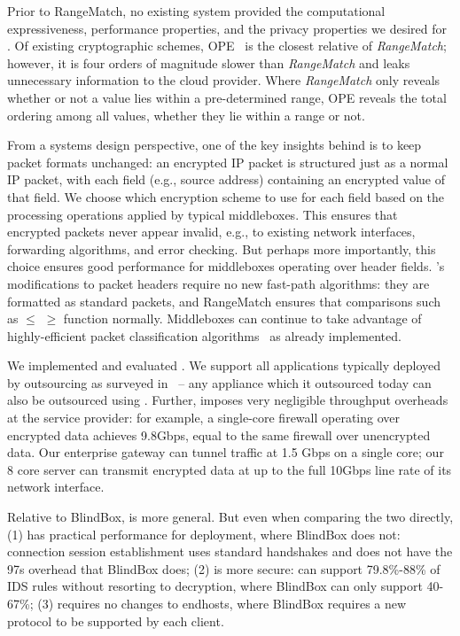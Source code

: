     Prior to RangeMatch, no existing system provided the computational expressiveness, performance properties, and the privacy properties we desired for \sys.
    Of existing cryptographic schemes, OPE~\cite{cryptdb} is the closest relative of {\it RangeMatch}; however, it is four orders of magnitude slower than {\it RangeMatch} and leaks unnecessary information to the cloud provider.
    Where {\em RangeMatch} only reveals whether or not a value lies within a pre-determined range, OPE reveals the total ordering among all values, whether they lie within a range or not.

  From a systems design perspective, one of the key insights behind \sys is to keep packet formats unchanged: an encrypted IP packet is structured just as a normal IP packet, with each field (e.g., source address) containing an encrypted value of that field.
  We choose which encryption scheme to use for each field based on the processing operations applied by typical middleboxes.
  This ensures that encrypted packets never appear invalid, e.g., to existing network interfaces, forwarding algorithms, and error checking. 
  But perhaps more importantly, this choice ensures good performance for middleboxes operating over header fields. 
  \sys's modifications to packet headers require no new fast-path algorithms: they are formatted as standard packets, and RangeMatch ensures that comparisons such as $\leq$ $\geq$ function normally.
  Middleboxes can continue to  take advantage of highly-efficient packet classification algorithms~\cite{somethingclassification--chang?} as already implemented.
  

We implemented and evaluated \sys. We support all applications typically deployed by outsourcing as surveyed in~\cite{aplomb} -- any appliance which it outsourced today can also be outsourced using \sys.
Further, \sys imposes very negligible throughput overheads at the service provider: for example, a single-core firewall operating over encrypted data achieves 9.8Gbps, equal to the same firewall over unencrypted data.
Our enterprise gateway can tunnel traffic at 1.5 Gbps on a single core;  our 8 core server can transmit \sys encrypted data at up to the full 10Gbps line rate of its network interface.

Relative to BlindBox, \sys is more general. But even when comparing the two directly, \sys (1) has practical performance for deployment, where BlindBox does not: connection session establishment uses standard handshakes and does not have the 97s overhead that BlindBox does; (2) is more secure: \sys can support 79.8\%-88\% of IDS rules without resorting to decryption, where BlindBox can only support 40-67\%; (3) requires no changes to endhosts, where BlindBox requires a new protocol to be supported by each client. 
